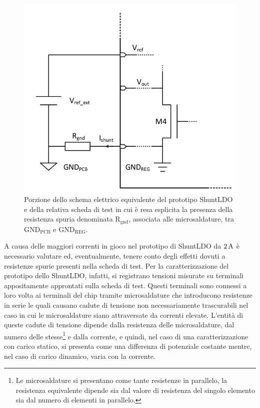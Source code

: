 \begin{figure}[!ht]
\centering
\includegraphics[scale=.3]{Immagini/Ground}
\caption{Porzione dello schema elettrico equivalente del prototipo ShuntLDO e della relativa scheda di test in cui \`e resa esplicita la presenza della resistenza spuria denominata $\mathrm{R_{gnd}}$, associata alle microsaldature, tra $\mathrm{GND_{PCB}}$ e $\mathrm{GND_{REG}}$.}
\label{Ground}
\end{figure}
A causa delle maggiori correnti in gioco nel prototipo di ShuntLDO da $2\rm \, A$ \`e necessario valutare ed, eventualmente, tenere conto degli effetti dovuti a resistenze spurie presenti nella scheda di test. Per la caratterizzazione del prototipo dello ShuntLDO, infatti, si registrano tensioni misurate su terminali appositamente approntati sulla scheda di test. 
Questi terminali sono connessi a loro volta ai terminali del chip tramite microsaldature che introducono resistenze in serie le quali causano cadute di tensione non necessariamente trascurabili nel caso in cui le microsaldature siano attraversate da correnti elevate. L'entità di queste cadute di tensione dipende dalla resistenza delle microsaldature, dal numero delle stesse\footnote{Le microsaldature si presentano come tante resistenze in parallelo, la resistenza equivalente dipende sia dal valore di resistenza del singolo elemento sia dal numero di elementi in parallelo.} e dalla corrente, e quindi, nel caso di una caratterizzazione con carico statico, si presenta come una differenza di potenziale costante mentre, nel caso di carico dinamico, varia con la corrente. 
